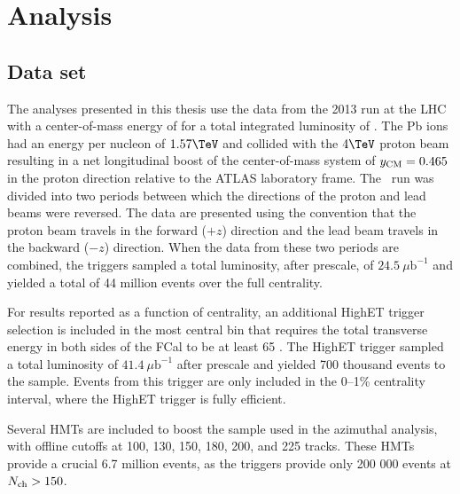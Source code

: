 \chapter{Analysis}
\label{ch:analysis}
\graphicspath{{Chapter-Analysis/figures/}}

\section{Data set}

The analyses presented in this thesis use the data from the 2013 \pPb run at the \ac{LHC} with a center-of-mass energy of \pPbenergy for a total integrated luminosity of \pPblumi.
The Pb ions had an energy per nucleon of $1.57 \TeV$ and collided with the $4 \TeV$ proton beam resulting in a net longitudinal boost of the center-of-mass system of $y_{\mathrm{CM}} = 0.465$ in the proton direction relative to the ATLAS laboratory frame.
The \pPb\ run was divided into two periods between which the directions of the proton and lead beams were
reversed. 
The data are presented using the convention that the proton beam travels in the forward ($+z$) direction and the lead beam travels in the backward ($-z$) direction.
When the data from these two periods are combined, the \minbias triggers sampled a total luminosity, after prescale, of $24.5~\mu\textrm{b}^{-1}$ and yielded a total of 44 million events over the full centrality.

For results reported as a function of centrality, an additional \ac{HighET} trigger selection is included in the most central bin that requires the total transverse energy in both sides of the \ac{FCal} to be at least 65 \GeV.
The \ac{HighET} trigger sampled a total luminosity of $41.4~\mu\textrm{b}^{-1}$ after prescale and yielded 700 thousand events to the sample.
Events from this trigger are only included in the 0--1\% centrality interval, where the \ac{HighET} trigger is fully efficient.

Several \acp{HMT} are included to boost the sample used in the azimuthal analysis, with offline \Nch cutoffs at 100, 130, 150, 180, 200, and 225 tracks.
These \acp{HMT} provide a crucial 6.7 million events, as the \minbias triggers provide only 200 000 events at $\mbox{$N_{\mathrm{ch}}$} > 150$.

